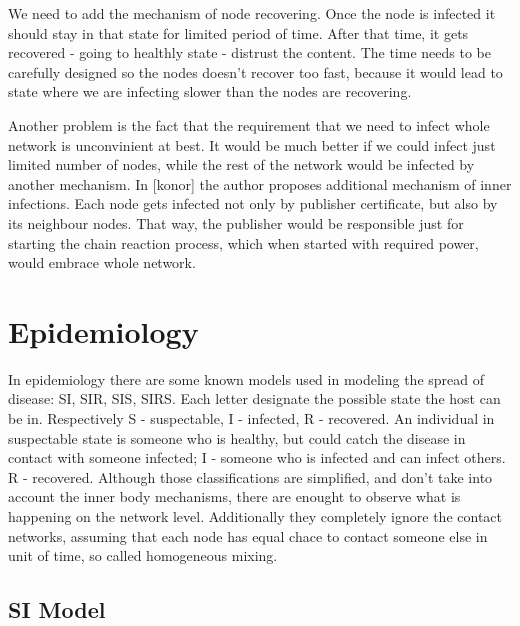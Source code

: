 \documentclass[nostrict]{szablonPG}
\begin{document}
We need to add the mechanism of node recovering. Once the node is infected it should stay in that state for limited period of time. After that time, it gets recovered - going to healthly state - distrust the content. The time needs to be carefully designed so the nodes doesn't recover too fast, because it would lead to state where we are infecting slower than the nodes are recovering. 

Another problem is the fact that the requirement that we need to infect whole network is unconvinient at best. It would be much better if we could infect just limited number of nodes, while the rest of the network would be infected by another mechanism.
In [konor] the author proposes additional mechanism of inner infections. Each node gets infected not only by publisher certificate, but also by its neighbour nodes. That way, the publisher would be responsible just for starting the chain reaction process, which when started with required power, would embrace whole network. 

\section{Epidemiology}
In epidemiology there are some known models used in modeling the spread of disease: SI, SIR, SIS, SIRS. Each letter designate the possible state the host can be in. Respectively S - suspectable, I - infected, R - recovered. An individual in suspectable state is someone who is healthy, but could catch the disease in contact with someone infected; I - someone who is infected and can infect others. R - recovered. Although those classifications are simplified, and don't take into account the inner body mechanisms, there are enought to observe what is happening on the network level. Additionally they completely ignore the contact networks, assuming that each node has equal chace to contact someone else in unit of time, so called homogeneous mixing.

\subsection{SI Model}
\end{document}
